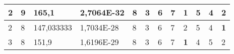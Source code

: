 \documentclass[conference]{IEEEtran}
\begin{document}
\begin{table*}[]
\begin{tabular}{|llll|llllllll|}
\multicolumn{1}{|l|}{2}                                                     & \multicolumn{1}{l|}{9}                                                        & \multicolumn{1}{l|}{165,1}                                                        & 2,7064E-32                     & \multicolumn{1}{l|}{8}                                                  & \multicolumn{1}{l|}{3}                                                  & \multicolumn{1}{l|}{6}                                                  & \multicolumn{1}{l|}{7}                                                  & \multicolumn{1}{l|}{\textbf{1}}                                         & \multicolumn{1}{l|}{5}                                                  & \multicolumn{1}{l|}{4}                                                  & 2                          \\ \hline
\multicolumn{1}{|l|}{2}                                                     & \multicolumn{1}{l|}{8}                                                        & \multicolumn{1}{l|}{147,033333}                                                   & 1,7034E-28                     & \multicolumn{1}{l|}{8}                                                  & \multicolumn{1}{l|}{3}                                                  & \multicolumn{1}{l|}{6}                                                  & \multicolumn{1}{l|}{7}                                                  & \multicolumn{1}{l|}{2}                                                  & \multicolumn{1}{l|}{5}                                                  & \multicolumn{1}{l|}{4}                                                  & \textbf{1}                 \\ \hline
\multicolumn{1}{|l|}{3}                                                     & \multicolumn{1}{l|}{8}                                                        & \multicolumn{1}{l|}{151,9}                                                        & 1,6196E-29                     & \multicolumn{1}{l|}{8}                                                  & \multicolumn{1}{l|}{3}                                                  & \multicolumn{1}{l|}{6}                                                  & \multicolumn{1}{l|}{7}                                                  & \multicolumn{1}{l|}{\textbf{1}}                                         & \multicolumn{1}{l|}{4}                                                  & \multicolumn{1}{l|}{5}                                                  & 2                          \\ \hline

\end{tabular}
\end{table*}
\end{document}
